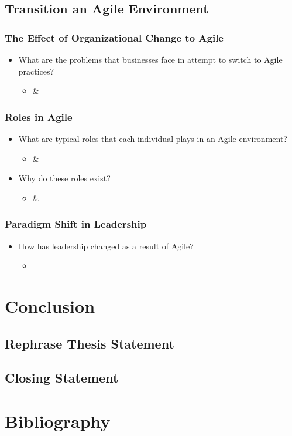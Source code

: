 \documentclass[12pt,a4paper]{article}
\begin{document}
    \subsection{Transition an Agile Environment}
        \subsubsection{The Effect of Organizational Change to Agile}
        \begin{itemize}[noitemsep]
            \item What are the problems that businesses face in attempt to switch to Agile practices?
            \begin{itemize}
                \item \cite{bosch_2014} \& \cite{meyer_2014}
            \end{itemize}
        \end{itemize}
        \subsubsection{Roles in Agile}
        \begin{itemize}[noitemsep]
            \item What are typical roles that each individual plays in an Agile environment?
            \begin{itemize}
                \item \cite{bosch_2014} \& \cite{meyer_2014}
            \end{itemize}
            \item Why do these roles exist?
            \begin{itemize}
                \item \cite{bosch_2014} \& \cite{meyer_2014}
            \end{itemize}
        \end{itemize}
        \subsubsection{Paradigm Shift in Leadership}
        \begin{itemize}[noitemsep]
            \item How has leadership changed as a result of Agile?
            \begin{itemize}
                \item \cite{bosch_2014}
            \end{itemize}
        \end{itemize}

\section{Conclusion}
    \subsection{Rephrase Thesis Statement}
    \subsection{Closing Statement}

\newpage
\section{Bibliography}
\nocite{*}


\end{document}
